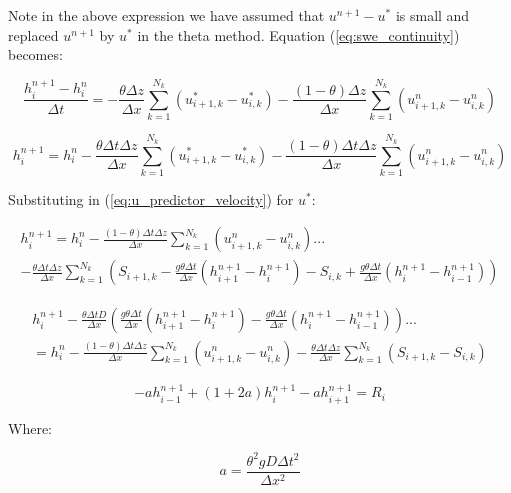 \documentclass[12pt]{article}
\begin{document}
Note in the above expression we have assumed that $u^{n+1} - u^*$ is small and replaced $u^{n+1}$ by $u^*$ in the theta method. Equation (\ref{eq:swe_continuity}) becomes:

\begin{equation} \label{eq:free_surface_theta}
\frac{h_{i}^{n+1} - h_i^n}{\Delta t} = - \frac{\theta \Delta z}{\Delta x} \sum_{k=1}^{N_k} (u_{i+1,k}^* - u_{i,k}^*) -  \frac{(1-\theta) \Delta z}{\Delta x} \sum_{k=1}^{N_k} (u_{i+1,k}^n - u_{i,k}^n)
\end{equation}

\begin{equation} \label{eq:h_update}
h_{i}^{n+1} = h_i^n - \frac{\theta \Delta t \Delta z}{\Delta x} \sum_{k=1}^{N_k} (u_{i+1,k}^* - u_{i,k}^*) -  \frac{(1-\theta) \Delta t \Delta z}{\Delta x} \sum_{k=1}^{N_k} (u_{i+1,k}^n - u_{i,k}^n)
\end{equation}

Substituting in (\ref{eq:u_predictor_velocity}) for $u^*$:

\begin{multline*}
h_{i}^{n+1} = h_i^n  - \frac{(1-\theta) \Delta t \Delta z}{\Delta x} \sum_{k=1}^{N_k} (u_{i+1,k}^n - u_{i,k}^n) ...
\\ 
- \frac{\theta \Delta t \Delta z}{\Delta x} \sum_{k=1}^{N_k} \left( S_{i+1,k} - \frac{g \theta \Delta t}{\Delta x} (h_{i+1}^{n+1} - h_{i}^{n+1}) - S_{i,k} + \frac{g \theta \Delta t}{\Delta x} (h_{i}^{n+1} - h_{i-1}^{n+1}) \right)
\end{multline*}

\begin{multline*}
h_{i}^{n+1} - \frac{\theta \Delta t D}{\Delta x} \left(\frac{g \theta \Delta t}{\Delta x} (h_{i+1}^{n+1} - h_{i}^{n+1}) - \frac{g \theta \Delta t}{\Delta x} (h_{i}^{n+1} - h_{i-1}^{n+1}) \right) ... 
\\= h_i^n  - \frac{(1-\theta) \Delta t \Delta z}{\Delta x} \sum_{k=1}^{N_k} (u_{i+1,k}^n - u_{i,k}^n) - \frac{\theta \Delta t \Delta z}{\Delta x} \sum_{k=1}^{N_k} ( S_{i+1,k} - S_{i,k} )
\end{multline*}

\begin{equation*}
-a h_{i-1}^{n+1} + (1+2a) h_i^{n+1} -a h_{i+1}^{n+1} = R_i
\end{equation*}

Where:

\begin{equation*}
a = \frac{\theta^2 g D \Delta t^2}{\Delta x^2}
\end{equation*}
\end{document}
